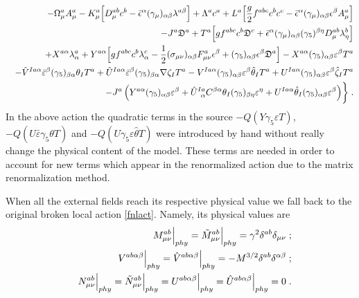 \begin{appendix}
\begin{eqnarray}
&&
- \Omega^{a}_{\mu} A^{a}_{\mu}
- K^{a}_{\mu}\Bigl[D^{ab}_{\mu}c^{b} - \bar{\epsilon}^\alpha(\gamma_\mu)_{\alpha\beta}\lambda^{a\beta}\Bigr]
+ \Lambda^{a}c^{a}
+ L^{a}\Bigl[ \frac{g}{2}f^{abc}c^{b}c^{c}
- \bar{\epsilon}^\alpha(\gamma_{\mu})_{\alpha\beta}\epsilon^\beta A^{a}_{\mu}\Bigr]\nonumber \\
&&
- J^{a}\mathfrak{D}^{a}
+ T^{a}\Bigl[gf^{abc}c^{b}\mathfrak{D}^{c}
+ \bar{\epsilon}^{\alpha}(\gamma_{\mu})_{\alpha \beta}(\gamma_{5})^{\beta\eta}D_{\mu}^{ab}\lambda^{b}_{\eta}\Bigr]\nonumber\\
&&+ X^{a\alpha}\lambda^{a}_{\alpha}
+Y^{a\alpha}\Bigl[ gf^{abc}c^{b}\lambda^{c}_{\alpha} - \frac{1}{2}(\sigma_{\mu\nu})_{\alpha\beta} F_{\mu\nu}^{a}\epsilon^{\beta}
+ (\gamma_{5})_{\alpha\beta}\epsilon^{\beta} \mathfrak{D}^a \Bigr]
- X^{a\alpha}(\gamma_{5})_{\alpha\beta}\varepsilon^{\beta}T^{a}
\nonumber \\
&&
- \hat{V}^{Ia\alpha}\bar{\varepsilon}^{\beta}(\gamma_{5})_{\beta\alpha}\theta_{I}T^{a}
+ \hat{U}^{Ia\alpha}\bar{\varepsilon}^{\beta}(\gamma_{5})_{\beta\alpha}\nabla\zeta_{I} T^{a}
- V^{Ia\alpha}(\gamma_{5})_{\alpha\beta}\varepsilon^{\beta}\hat{\theta}_{I}T^{a}
+ U^{Ia\alpha}(\gamma_{5})_{\alpha\beta}\varepsilon^{\beta}\hat{\zeta}_{I}T^{a}
\nonumber \\
&&
- J^{a}  \left(
Y^{a\alpha}(\gamma_{5})_{\alpha \beta}\varepsilon^{\beta}
+ \hat{U}^{Ia}_{\;\;\alpha}C^{\beta\alpha}\theta_{I}(\gamma_{5})_{\beta\eta}\varepsilon^{\eta}
+ U^{Ia\alpha}\hat{\theta}_{I}(\gamma_{5})_{\alpha\beta}\varepsilon^{\beta}
\right)
\biggr\}\;.
\end{eqnarray}
In the above action the quadratic terms in the source $-Q(Y\gamma_{5}\varepsilon T)$, $-Q(\hat{U}\bar{\varepsilon}\gamma_{5}\theta T)$ and $-Q(U\gamma_{5}\varepsilon \hat{\theta}T)$ were introduced by hand without really change the physical content of the model. These terms are needed in order to account for new terms which appear in the renormalized action due to the matrix renormalization method.

\noindent When all the external fields reach its respective physical value we fall back to the original broken local action \eqref{fnlact}. Namely, its physical values are
\begin{eqnarray}
\label{physval2}
&&
M^{ab}_{\mu\nu}\Big{|}_{phy}=\tilde{M}^{ab}_{\mu\nu}\Big{|}_{phy}=
\gamma^{2}\delta^{ab}\delta_{\mu\nu}
\;;\nonumber \\
&&
V^{ab\alpha\beta}\Big{|}_{phy}=\hat{V}^{ab\alpha\beta}\Big{|}_{phy}=
-M^{3/2}\delta^{ab}\delta^{\alpha\beta}
\;;\nonumber \\
&&
N^{ab}_{\mu\nu}\Big{|}_{phy}=\tilde{N}^{ab}_{\mu\nu}\Big{|}_{phy}=
U^{ab\alpha\beta}\Big{|}_{phy}=\hat{U}^{ab\alpha\beta}\Big{|}_{phy}=0
\;.
\end{eqnarray}



\end{appendix}
